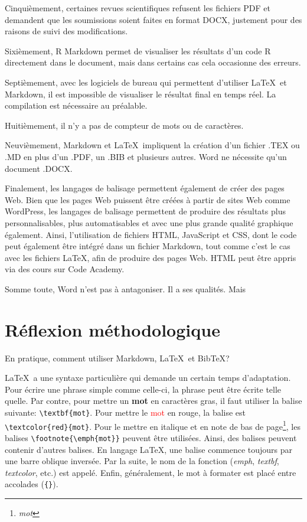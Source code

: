 \documentclass[
  letterpaper,
  DIV=11,
  numbers=noendperiod]{scrreprt}
\begin{document}
Cinquièmement, certaines revues scientifiques refusent les fichiers PDF
et demandent que les soumissions soient faites en format DOCX, justement
pour des raisons de suivi des modifications.

Sixièmement, R Markdown permet de visualiser les résultats d'un code R
directement dans le document, mais dans certains cas cela occasionne des
erreurs.

Septièmement, avec les logiciels de bureau qui permettent d'utiliser
\LaTeX~et Markdown, il est impossible de visualiser le résultat final en
temps réel. La compilation est nécessaire au préalable.

Huitièmement, il n'y a pas de compteur de mots ou de caractères.

Neuvièmement, Markdown et \LaTeX~impliquent la création d'un fichier
.TEX ou .MD en plus d'un .PDF, un .BIB et plusieurs autres. Word ne
nécessite qu'un document .DOCX.

Finalement, les langages de balisage permettent également de créer des
pages Web. Bien que les pages Web puissent être créées à partir de sites
Web comme WordPress, les langages de balisage permettent de produire des
résultats plus personnalisables, plus automatisables et avec une plus
grande qualité graphique également. Ainsi, l'utilisation de fichiers
HTML, JavaScript et CSS, dont le code peut également être intégré dans
un fichier Markdown, tout comme c'est le cas avec les fichiers \LaTeX,
afin de produire des pages Web. HTML peut être appris via des cours sur
Code Academy.

Somme toute, Word n'est pas à antagoniser. Il a ses qualités. Mais

\hypertarget{ruxe9flexion-muxe9thodologique-1}{%
\section{Réflexion
méthodologique}\label{ruxe9flexion-muxe9thodologique-1}}

En pratique, comment utiliser Markdown, \LaTeX~et BibTeX?

\LaTeX~a une syntaxe particulière qui demande un certain temps
d'adaptation. Pour écrire une phrase simple comme celle-ci, la phrase
peut être écrite telle quelle. Par contre, pour mettre un \textbf{mot}
en caractères gras, il faut utiliser la balise suivante:
\texttt{\textbackslash{}textbf\{mot\}}. Pour mettre le
\textcolor{red}{mot} en rouge, la balise est
\texttt{\textbackslash{}textcolor\{red\}\{mot\}}. Pour le mettre en
italique et en note de bas de page\footnote{\emph{mot}}, les balises
\texttt{\textbackslash{}footnote\{\textbackslash{}emph\{mot\}\}} peuvent
être utilisées. Ainsi, des balises peuvent contenir d'autres balises. En
langage \LaTeX, une balise commence toujours par une barre oblique
inversée. Par la suite, le nom de la fonction (\emph{emph},
\emph{textbf}, \emph{textcolor}, etc.) est appelé. Enfin, généralement,
le mot à formater est placé entre accolades (\texttt{\{\}}).
\end{document}
